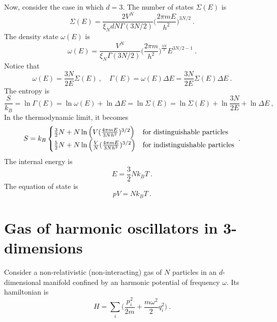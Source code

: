     Now, consider the case in which $d = 3$.
    The number of states $\Sigma(E)$ is 
    \begin{equation*}
        \Sigma(E) = \frac{2V^{N}}{\xi_N d N \Gamma(3N/2)} \Big ( \frac{2 \pi m E}{h^2}\Big)^{3N/2} ~.
    \end{equation*}
    The density state $\omega(E)$ is
    \begin{equation*}
        \omega (E) = \frac{V^N}{\xi_N \Gamma(3N/2)} \Big ( \frac{2 \pi m}{h^2} \Big )^{\frac{3N}{2}} E^{3N/2-1} ~.
    \end{equation*}
    Notice that 
    \begin{equation*}
        \omega(E) = \frac{3N}{2E} \Sigma(E) ~, \quad \Gamma(E) = \omega(E) \Delta E = \frac{3N}{2E} \Sigma(E) \Delta E ~.
    \end{equation*}
    The entropy is 
    \begin{equation*}
        \frac{S}{k_B} = \ln \Gamma(E) = \ln \omega(E) + \ln \Delta E = \ln \Sigma(E) = \ln \Sigma(E) + \ln \frac{3N}{2E} + \ln \Delta E ~,
    \end{equation*}
    In the thermodynamic limit, it becomes
    \begin{equation*}
        S = k_B \begin{cases}
            \frac{3}{2} N + N \ln \Big ( V (\frac{4 \pi m E}{3 N h^2})^{3/2} \Big) & \textnormal{for distinguishable particles} \\
            \frac{5}{2} N + N \ln \Big ( \frac{V}{N} (\frac{4 \pi m E}{3 N h^2})^{3/2} \Big) & \textnormal{for indistinguishable particles} \\
        \end{cases} ~.
    \end{equation*}
    The internal energy is 
    \begin{equation*}
        E = \frac{3}{2} N k_B T ~.
    \end{equation*}
    The equation of state is  
    \begin{equation*}
        p V = N k_B T ~.
    \end{equation*}

\section{Gas of harmonic oscillators in 3-dimensions}

    Consider a non-relativistic (non-interacting) gas of $N$ particles in an $d$-dimensional manifold confined by an harmonic potential of frequency $\omega$. Its hamiltonian is 
    \begin{equation*}
        H = \sum_i \Big ( \frac{p^2_i}{2m} + \frac{m \omega^2}{2} q_i^2 \Big ) ~.
    \end{equation*}


